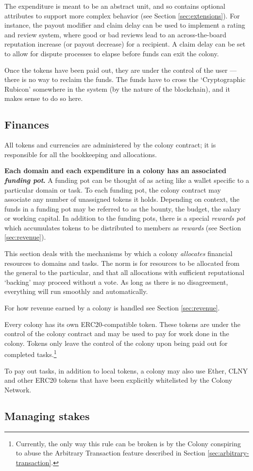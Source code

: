 The expenditure is meant to be an abstract unit, and so contains optional attributes to support more complex behavior (see Section \ref{sec:extensions}). For instance, the payout modifier and claim delay can be used to implement a rating and review system, where good or bad reviews lead to an across-the-board reputation increase (or payout decrease) for a recipient. A claim delay can be set to allow for dispute processes to elapse before funds can exit the colony.

Once the tokens have been paid out, they are under the control of the user --- there is no way to reclaim the funds. The funds have to cross the `Cryptographic Rubicon' somewhere in the system (by the nature of the blockchain), and it makes sense to do so here.

\subsection{Finances}\label{sec:finance}

All tokens and currencies are administered by the colony contract; it is responsible for all the bookkeeping and allocations.

\textbf{Each domain and each expenditure in a colony has an associated \emph{funding pot}.} A funding pot can be thought of as acting like a wallet specific to a particular domain or task. To each funding pot, the colony contract may associate any number of unassigned tokens it holds. Depending on context, the funds in a funding pot may be referred to as the bounty, the budget, the salary or working capital. In addition to the funding pots, there is a special \emph{rewards pot} which accumulates tokens to be distributed to members as \textit{rewards} (see Section \ref{sec:revenue}).

This section deals with the mechanisms by which a colony \emph{allocates} financial resources to domains and tasks. The norm is for resources to be allocated from the general to the particular, and that all allocations with sufficient reputational `backing' may proceed without a vote. As long as there is no disagreement, everything will run smoothly and automatically.

For how revenue earned by a colony is handled see Section \ref{sec:revenue}.

Every colony has its own ERC20-compatible token. These tokens are under the control of the colony contract and may be used to pay for work done in the colony. Tokens only leave the control of the colony upon being paid out for completed tasks.\footnote{Currently, the only way this rule can be broken is by the Colony conspiring to abuse the Arbitrary Transaction feature described in Section \ref{sec:arbitrary-transaction}. }

To pay out tasks, in addition to local tokens, a colony may also use Ether, CLNY and other ERC20 tokens that have been explicitly whitelisted by the Colony Network.

\subsection{Managing stakes}\label{sec:stakes}
